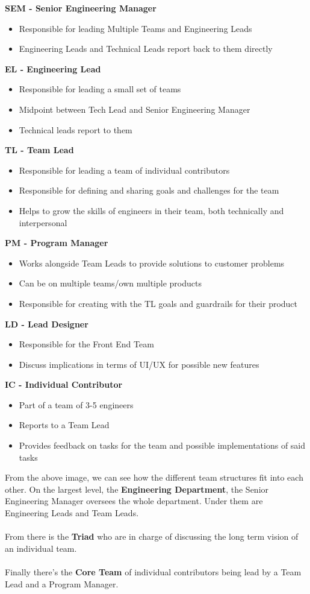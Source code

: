 \documentclass[11pt]{article} %
\begin{document}
\textbf{SEM -  Senior Engineering Manager}
\begin{itemize}
	\item Responsible for leading Multiple Teams and Engineering Leads
	\item Engineering Leads and Technical Leads report back to them directly
\end{itemize}
\textbf{EL -  Engineering Lead}
\begin{itemize}
\item Responsible for leading a small set of teams
\item Midpoint between Tech Lead and Senior Engineering Manager
\item Technical leads report to them
\end{itemize}
\textbf{TL -  Team Lead}
\begin{itemize}
\item Responsible for leading a team of individual contributors
\item Responsible for defining and sharing goals and challenges for the team
\item Helps to grow the skills of engineers in their team, both technically and interpersonal
\end{itemize}
\textbf{PM -  Program Manager}
\begin{itemize}
\item Works alongside Team Leads to provide solutions to customer problems
\item Can be on multiple teams/own multiple products
\item Responsible for creating with the TL goals and guardrails for their product
\end{itemize}
\textbf{LD -  Lead Designer}
\begin{itemize}
\item Responsible for the Front End Team
\item Discuss implications in terms of UI/UX for possible new features
\end{itemize}
\textbf{IC -  Individual Contributor}
\begin{itemize}
\item Part of a team of 3-5 engineers
\item Reports to a Team Lead
\item Provides feedback on tasks for the team and possible implementations of said tasks
\end{itemize}
From the above image, we can see how the different team structures fit into each other. On the largest level, the \textbf{Engineering Department}, the Senior Engineering Manager oversees the whole department. Under them are Engineering Leads and Team Leads. 
\\\\
From there is the \textbf{Triad} who are in charge of discussing the long term vision of an individual team. 
\\\\
Finally there's the \textbf{Core Team} of individual contributors being lead by a Team Lead and a Program Manager.
\end{document}
